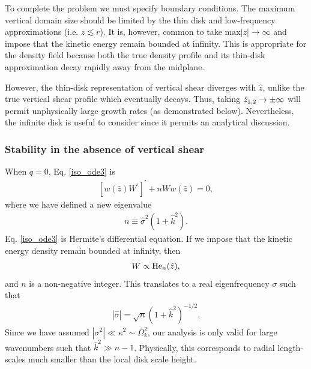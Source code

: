 To complete the problem we must specify boundary conditions. The 
maximum vertical domain size should be limited by the thin
disk and low-frequency approximations (i.e. $z\lesssim r$).     
It is, however, common to take $\mathrm{max}|z|\to\infty$ and impose
that the kinetic  energy remain bounded at infinity. This 
is appropriate for the density field because both the true density profile 
and its thin-disk approximation decay rapidly away from the midplane.   

However, the thin-disk representation of vertical shear diverges with 
$\hat{z}$, unlike the true vertical shear profile which eventually
decays.  Thus, taking $\hat{z}_{1,2}\to \pm\infty$ will permit unphysically large growth
rates (as demonstrated below). Nevertheless, the infinite disk is
useful to consider since it permits an analytical discussion. 

\subsubsection{Stability in the absence of vertical shear}
When $q=0$, Eq. \ref{iso_ode3} is
\begin{align}\label{hermite_ode}
  \left[w(\hat{z})W^\prime \right]^\prime + nW
  w(\hat{z}) =0, 
\end{align}
where we have defined a new eigenvalue
\begin{align}
  n \equiv \hat{\sigma}^2(1+\hat{k}^2). 
\end{align} 
Eq. \ref{iso_ode3} is Hermite's differential equation. If we impose
that the kinetic energy density remain bounded at infinity, then  
\begin{align}
  W \propto \operatorname{He}_n(\hat{z}),
\end{align}
and $n$ is a non-negative integer. This translates to a real
eigenfrequency $\sigma$ such that
\begin{align}
  \left|\hat{\sigma}\right| = \sqrt{n}
  \left(1+\hat{k}^2\right)^{-1/2}. 
\end{align}
Since we have assumed $|\sigma^2|\ll \kappa^2\sim \Omega_k^2$, our
analysis is only valid for large wavenumbers such that $\hat{k}^2\gg   
n-1$. Physically, this corresponds to radial length-scales much
smaller than the local disk scale height. 

